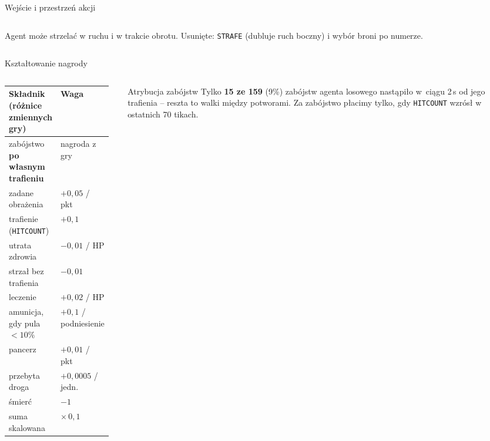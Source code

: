 \documentclass[aspectratio=169,10pt]{beamer}
\newcommand{\slidenum}{}
\begin{document}
\begin{frame}{Wejście i przestrzeń akcji}
\begin{columns}[T,onlytextwidth]
\begin{column}{0.56\textwidth}
      \vspace{2mm}
      {\scriptsize\color{muted}Agent może strzelać w ruchu i w trakcie obrotu.
      Usunięte: \texttt{STRAFE} (dubluje ruch boczny) i wybór broni po numerze.\par}
    \end{column}
  \end{columns}
\end{frame}

\renewcommand{\slidenum}{03}
\begin{frame}{Kształtowanie nagrody}
  \begin{columns}[T,onlytextwidth]
    \begin{column}{0.5\textwidth}
      \scriptsize
      \renewcommand{\arraystretch}{1.3}
      \begin{tabular}{@{}>{\raggedright\arraybackslash}p{0.6\linewidth}>{\raggedleft\arraybackslash}p{0.34\linewidth}@{}}
        \toprule
        \textbf{Składnik} {\color{muted}(różnice zmiennych gry)} & \textbf{Waga} \\
        \midrule
        zabójstwo \textbf{po własnym trafieniu} & nagroda z gry \\
        zadane obrażenia & $+0{,}05$ / pkt \\
        trafienie (\texttt{HITCOUNT}) & $+0{,}1$ \\
        utrata zdrowia & $-0{,}01$ / HP \\
        strzał bez trafienia & $-0{,}01$ \\
        leczenie & $+0{,}02$ / HP \\
        amunicja, gdy pula $<10\%$ & $+0{,}1$ / podniesienie \\
        pancerz & $+0{,}01$ / pkt \\
        przebyta droga & $+0{,}0005$ / jedn. \\
        śmierć & $-1$ \\
        \midrule
        suma skalowana & $\times\,0{,}1$ \\
        \bottomrule
      \end{tabular}
    \end{column}
    \begin{column}{0.46\textwidth}
      \begin{infocard}{\faExclamationTriangle}{Atrybucja zabójstw}
        Tylko \textbf{15 ze 159} (9\%) zabójstw agenta losowego nastąpiło
        w~ciągu 2\,s od jego trafienia -- reszta to walki między potworami.
        Za zabójstwo płacimy tylko, gdy \texttt{HITCOUNT} wzrósł w ostatnich 70 tikach.

\end{infocard}
\end{column}
\end{columns}
\end{frame}
\end{document}
